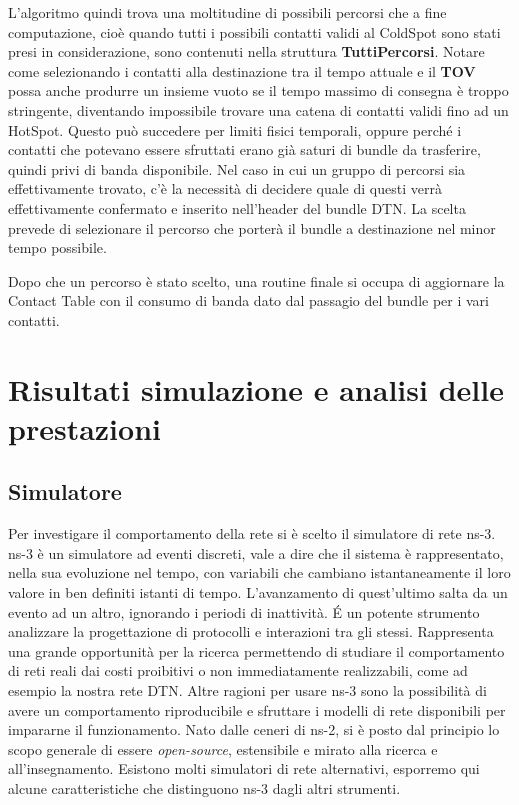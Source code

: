 \documentclass[12pt,a4paper,oneside]{book}
\begin{document}
		L'algoritmo quindi trova una moltitudine di possibili percorsi che a fine computazione, cioè quando tutti i possibili contatti validi al ColdSpot sono stati presi in considerazione, sono contenuti nella struttura {\bf TuttiPercorsi}. Notare come selezionando i contatti alla destinazione tra il tempo attuale e il {\bf TOV} possa anche produrre un insieme vuoto se il tempo massimo di consegna è troppo stringente, diventando impossibile trovare una catena di contatti validi fino ad un HotSpot. Questo può succedere per limiti fisici temporali, oppure perché i contatti che potevano essere sfruttati erano già saturi di bundle da trasferire, quindi privi di banda disponibile. Nel caso in cui un gruppo di percorsi sia effettivamente trovato, c'è la necessità di decidere quale di questi verrà effettivamente confermato e inserito nell'header del bundle DTN. La scelta prevede di selezionare il percorso che porterà il bundle a destinazione nel minor tempo possibile.
		
		Dopo che un percorso è stato scelto, una routine finale si occupa di aggiornare la Contact Table con il consumo di banda dato dal passagio del bundle per i vari contatti.

		
	\chapter{Risultati simulazione e analisi delle prestazioni}
		
		\section{Simulatore}
		Per investigare il comportamento della rete si è scelto il simulatore di rete ns-3. 
		ns-3 è un simulatore ad eventi discreti, vale a dire che il sistema è rappresentato, nella sua evoluzione nel tempo, con variabili che cambiano istantaneamente il loro valore in ben definiti istanti di tempo. L'avanzamento di quest'ultimo salta da un evento ad un altro, ignorando i periodi di inattività. \'E un potente strumento analizzare la progettazione di protocolli e interazioni tra gli stessi. Rappresenta una grande opportunità per la ricerca permettendo di studiare il comportamento di reti reali dai costi proibitivi o non immediatamente realizzabili, come ad esempio la nostra rete DTN. Altre ragioni per usare ns-3 sono la possibilità di avere un comportamento riproducibile e sfruttare i modelli di rete disponibili per impararne il funzionamento. Nato dalle ceneri di ns-2, si è posto dal principio lo scopo generale di essere {\it open-source}, estensibile e mirato alla ricerca e all'insegnamento.  Esistono molti simulatori di rete alternativi, esporremo qui alcune caratteristiche che distinguono ns-3 dagli altri strumenti.
		
\end{document}
